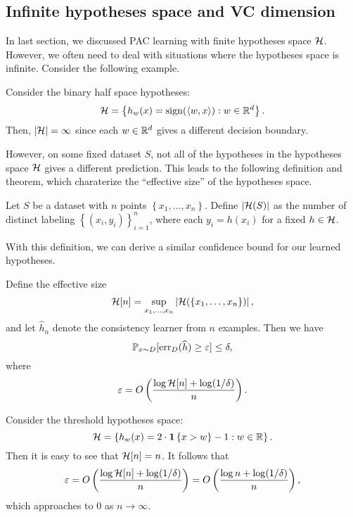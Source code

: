 \documentclass[a4paper]{article}
\begin{document}
\subsection{Infinite hypotheses space and VC dimension}

In last section, we discussed PAC learning with finite 
hypotheses space $\mathcal{H}$. However, we often need 
to deal with situations where the hypotheses space 
is infinite. Consider the following example.

\begin{eg}
  Consider the binary half space hypotheses: 
  \[
  \mathcal{H} = \left\{ h_w(x) = 
  \operatorname{sign}(\left\langle w, x \right\rangle) : w \in \mathbb{R}^d \right\}.
  \]
  Then, $\left\lvert \mathcal{H}\right\rvert = \infty$ since each 
  $w \in \mathbb{R}^d$ gives a different decision boundary.
\end{eg}

However, on some fixed dataset $S$, not all of the hypotheses
in the hypotheses space $\mathcal{H}$ gives a different prediction. 
This leads to the following definition and theorem, which 
charaterize the ``effective size'' of the hypotheses
space.

\begin{defi}
  Let $S$ be a dataset with $n$ points 
  $\left\{ x_1, \dots, x_n \right\}$. Define 
  $\left\lvert \mathcal{H}(S)\right\rvert$ as the number of distinct labeling 
  $\left\{ (x_i, y_i) \right\}_{i=1}^n$, where each 
  $y_i = h(x_i)$ for a fixed $h \in \mathcal{H}$.
\end{defi}

With this definition, we can derive a similar confidence 
bound for our learned hypotheses.

\begin{thm}
  Define the effective size
  \[
  \mathcal{H} [n] = \sup_{x_1, \dots, x_n} 
  \left\lvert \mathcal{H}(\left\{ x_1, \dots, x_n \right\})\right\rvert,
  \]  
  and let $\hat{h}_n$ denote the consistency learner
  from $n$ examples. Then we have 
  \[
  \mathbb{P}_{x \sim D} [\operatorname{err}_D(\widehat{h}) \geq \varepsilon] \leq \delta, 
  \] 
  where 
  \[
  \varepsilon = O \left( 
    \frac{\log \mathcal{H}[n] + \log (1 / \delta)}{n}
   \right).
  \]
\end{thm}

\begin{eg}
  Consider the threshold hypotheses space: 
  \[
  \mathcal{H} = \left\{ h_w(x) = 2 \cdot 
  \mathbf{1} \left\{ x > w \right\} - 1 : w \in \mathbb{R} \right\}.
  \]
  Then it is easy to see that $\mathcal{H}[n] = n$. 
  It follows that
  \[
  \varepsilon = O\left( 
    \frac{\log \mathcal{H}[n] + \log (1 / \delta)}{n}
   \right) = O\left( 
    \frac{\log n + \log (1 / \delta)}{n}
   \right),
  \]
  which approaches to $0$ as $n \to \infty$.
\end{eg}
\end{document}
